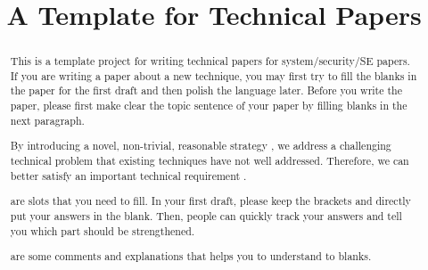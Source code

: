 \documentclass[sigconf, anonymous]{acmart}
\begin{document}
\title{A Template for Technical Papers} 
\begin{abstract}
    This is a template project for writing technical papers for system/security/SE papers. If you are writing a paper about a new technique, you may first try to fill the blanks in the paper for the first draft and then polish the language later. Before you write the paper, please first make clear the topic sentence of your paper by filling blanks in the next paragraph. 

    By introducing a novel, non-trivial, reasonable strategy \blank{}, we address a challenging technical problem \blank{} that existing techniques have not well addressed. Therefore, we can better satisfy an important technical requirement \blank{}. 

    \blank{} are slots that you need to fill. In your first draft, please keep the brackets and directly put your answers in the blank. Then, people can quickly track your answers and tell you which part should be strengthened. 

    \explain{} are some comments and explanations that helps you to understand to blanks.
\end{abstract}
\maketitle










% 
% 
% 



\end{document}
